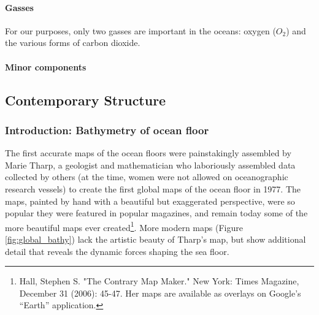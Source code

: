 \paragraph{Gasses}
For our purposes, only two gasses are important in the oceans: oxygen ($O_2$) and the various forms of carbon dioxide. 
\paragraph{Minor components}

\subsection{Contemporary Structure}
\subsubsection{Introduction: Bathymetry of ocean floor}
The first accurate maps of the ocean floors were painstakingly assembled by Marie Tharp, a geologist and mathematician who laboriously assembled data collected by others (at the time, women were not allowed on oceanographic research vessels) to create the first global maps of the ocean floor in 1977. The maps, painted by hand with a beautiful but exaggerated perspective, were so popular they were featured in popular magazines, and remain today some of the more beautiful maps ever created\footnote{Hall, Stephen S. "The Contrary Map Maker." New York: Times Magazine, December 31 (2006): 45-47. Her maps are available as overlays on Google's ``Earth'' application.}. More modern maps (Figure \ref{fig:global_bathy}) lack the artistic beauty of Tharp's map, but show additional detail that reveals the dynamic forces shaping the sea floor.\\

